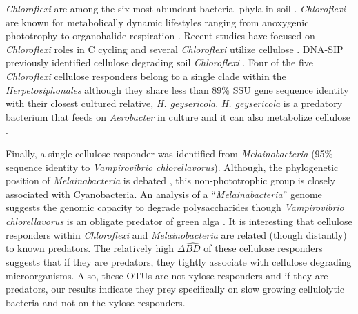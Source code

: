 \textit{Chloroflexi} are among the six most abundant bacterial phyla in
soil \citep{Janssen2006}. \textit{Chloroflexi} are known for
metabolically dynamic lifestyles ranging from anoxygenic phototrophy to
organohalide respiration \citep{Hug_2013}. Recent studies have focused on
\textit{Chloroflexi} roles in C cycling
\citep{Hug_2013,Goldfarb_2011,Cole_2013} and several \textit{Chloroflexi}
utilize cellulose \citep{Hug_2013,Goldfarb_2011,Cole_2013}. DNA-SIP previously
identified cellulose degrading soil \textit{Chloroflexi}
\citep{Schellenberger_2010}. Four of the five \textit{Chloroflexi}
cellulose responders belong to a single clade within the
\textit{Herpetosiphonales} although they share less than 89\% SSU gene sequence
identity with their closest cultured relative, \textit{H. geysericola}.
\textit{H. geysericola} is a predatory bacterium that feeds on
\textit{Aerobacter} in culture and it can also metabolize cellulose
\citep{Lewin1970}. 

Finally, a single cellulose responder was identified from
\textit{Melainobacteria} (95\% sequence identity to \textit{Vampirovibrio
chlorellavorus}). Although, the phylogenetic position of
\textit{Melainabacteria} is debated \citep{Soo_2014}, this non-phototrophic
group is closely associated with Cyanobacteria. An analysis of
a ``\textit{Melainabacteria}'' genome \citep{Di_Rienzi_2013} suggests the genomic capacity
to degrade polysaccharides though \textit{Vampirovibrio chlorellavorus} is
an obligate predator of green alga \citep{gromov_1972}. 
It is interesting that cellulose responders within \textit{Chloroflexi} and
\textit{Melainobacteria} are related (though distantly) to known predators. The
relatively high $\Delta\hat{BD}$ of these cellulose responders suggests that if
they are predators, they tightly associate with cellulose degrading
microorganisms. Also, these OTUs are not xylose responders and if they are
predators, our results indicate they prey specifically on slow growing
cellulolytic bacteria and not on the xylose responders. 

